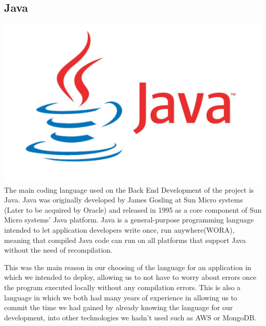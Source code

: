 \subsection{Java}
\includegraphics[scale = 0.6]{img/java-logo-1.png}\newline
The main coding language used on the Back End Development of the project is Java. Java was originally developed by James Gosling at Sun Micro systems (Later to be acquired by Oracle) and released in 1995 as a core component of Sun Micro systems' Java platform. Java is a general-purpose programming language intended to let application developers write once, run anywhere(WORA), meaning that compiled Java code can run on all platforms that support Java without the need of recompilation. \par
This was the main reason in our choosing of the language for an application in which we intended to deploy, allowing us to not have to worry about errors once the program executed locally without any compilation errors. This is also a language in which we both had many years of experience in allowing us to commit the time we had gained by already knowing the language for our development, into other technologies we hadn't used such as AWS or MongoDB.

